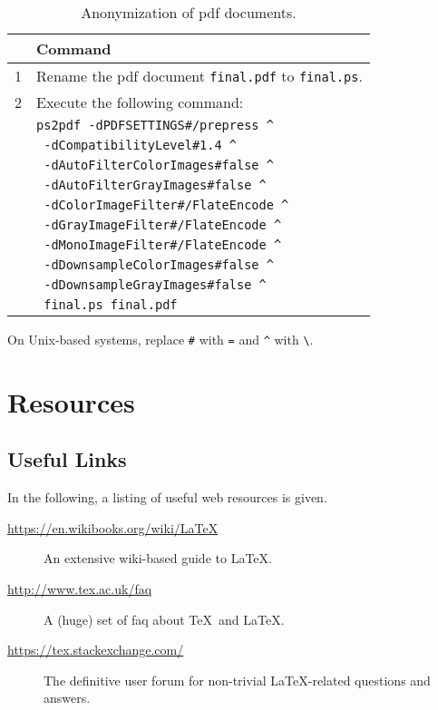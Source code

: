 \begin{table}[h]
  \centering
  \begin{tabular}{rl}
  \toprule
  & Command \\
  \midrule
  1 & Rename the \gls{pdf} document \verb|final.pdf| to \verb|final.ps|. \\
  2 & Execute the following command: \\
    & \verb|ps2pdf -dPDFSETTINGS#/prepress ^| \\
    & \verb| -dCompatibilityLevel#1.4 ^| \\
    & \verb| -dAutoFilterColorImages#false ^| \\
    & \verb| -dAutoFilterGrayImages#false ^| \\
    & \verb| -dColorImageFilter#/FlateEncode ^| \\
    & \verb| -dGrayImageFilter#/FlateEncode ^| \\
    & \verb| -dMonoImageFilter#/FlateEncode ^| \\
    & \verb| -dDownsampleColorImages#false ^| \\
    & \verb| -dDownsampleGrayImages#false ^| \\
    & \verb| final.ps final.pdf| \\
  \bottomrule
  \end{tabular}

  On Unix-based systems, replace \verb|#| with \verb|=| and \verb|^| with \verb|\|.
  \caption{Anonymization of \gls{pdf} documents.}
  \label{tab:ps2pdf}
\end{table}

\section{Resources}

\subsection{Useful Links}

In the following, a listing of useful web resources is given.
\begin{description}
\item[\url{https://en.wikibooks.org/wiki/LaTeX}] An extensive wiki-based guide to \LaTeX.
\item[\url{http://www.tex.ac.uk/faq}] A (huge) set of \gls{faq} about \TeX\ and \LaTeX.
\item[\url{https://tex.stackexchange.com/}] The definitive user forum for non-trivial \LaTeX-related questions and answers.
\end{description}

